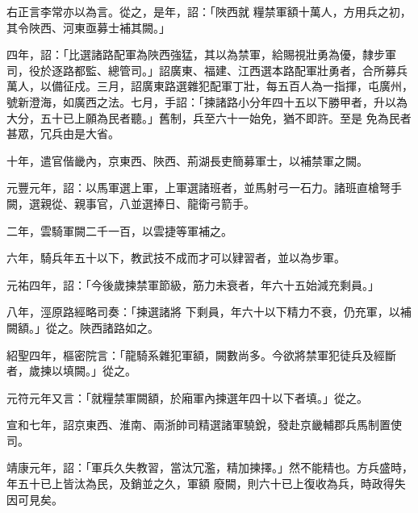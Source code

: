 \begin{pinyinscope}
 右正言李常亦以為言。從之，是年，詔：「陜西就
 糧禁軍額十萬人，方用兵之初，其令陜西、河東亟募士補其闕。」



 四年，詔：「比選諸路配軍為陜西強猛，其以為禁軍，給賜視壯勇為優，隸步軍司，役於逐路都監、總管司。」詔廣東、福建、江西選本路配軍壯勇者，合所募兵萬人，以備征戍。三月，詔廣東路選雜犯配軍丁壯，每五百人為一指揮，屯廣州，號新澄海，如廣西之法。七月，手詔：「揀諸路小分年四十五以下勝甲者，升以為大分，五十已上願為民者聽。」舊制，兵至六十一始免，猶不即許。至是
 免為民者甚眾，冗兵由是大省。



 十年，遣官偕畿內，京東西、陜西、荊湖長吏簡募軍士，以補禁軍之闕。



 元豐元年，詔：以馬軍選上軍，上軍選諸班者，並馬射弓一石力。諸班直槍弩手闕，選親從、親事官，八並選捧日、龍衛弓箭手。



 二年，雲騎軍闕二千一百，以雲捷等軍補之。



 六年，騎兵年五十以下，教武技不成而才可以肄習者，並以為步軍。



 元祐四年，詔：「今後歲揀禁軍節級，筋力未衰者，年六十五始減充剩員。」



 八年，涇原路經略司奏：「揀選諸將
 下剩員，年六十以下精力不衰，仍充軍，以補闕額。」從之。陜西諸路如之。



 紹聖四年，樞密院言：「龍騎系雜犯軍額，闕數尚多。今欲將禁軍犯徒兵及經斷者，歲揀以填闕。」從之。



 元符元年又言：「就糧禁軍闕額，於廂軍內揀選年四十以下者填。」從之。



 宣和七年，詔京東西、淮南、兩浙帥司精選諸軍驍銳，發赴京畿輔郡兵馬制置使司。



 靖康元年，詔：「軍兵久失教習，當汰冗濫，精加揀擇。」然不能精也。方兵盛時，年五十已上皆汰為民，及銷並之久，軍額
 廢闕，則六十已上復收為兵，時政得失因可見矣。




\end{pinyinscope}
